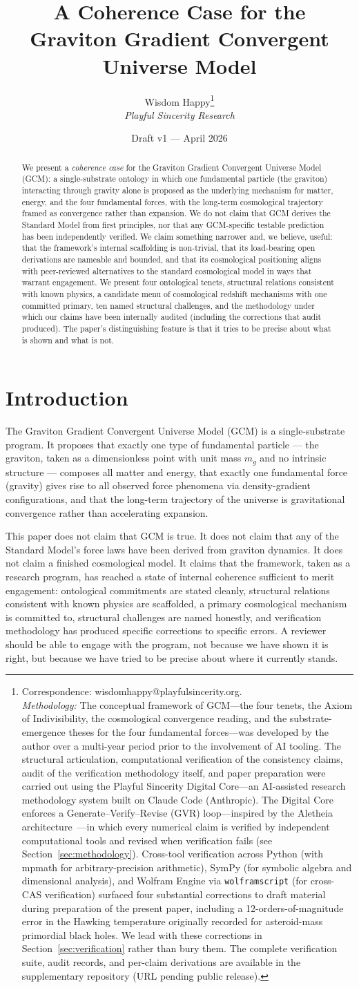 \documentclass[12pt]{article}
\title{A Coherence Case for the \\
Graviton Gradient Convergent Universe Model}
\author{Wisdom Happy\thanks{Correspondence: wisdomhappy@playfulsincerity.org. \\[0.5em]
\textit{Methodology:} The conceptual framework of GCM---the four tenets, the Axiom of Indivisibility, the cosmological convergence reading, and the substrate-emergence theses for the four fundamental forces---was developed by the author over a multi-year period prior to the involvement of AI tooling. The structural articulation, computational verification of the consistency claims, audit of the verification methodology itself, and paper preparation were carried out using the Playful Sincerity Digital Core---an AI-assisted research methodology system built on Claude Code (Anthropic). The Digital Core enforces a Generate--Verify--Revise (GVR) loop---inspired by the Aletheia architecture~\cite{feng2026aletheia}---in which every numerical claim is verified by independent computational tools and revised when verification fails (see Section~\ref{sec:methodology}). Cross-tool verification across Python (with mpmath for arbitrary-precision arithmetic), SymPy (for symbolic algebra and dimensional analysis), and Wolfram Engine via \texttt{wolframscript} (for cross-CAS verification) surfaced four substantial corrections to draft material during preparation of the present paper, including a 12-orders-of-magnitude error in the Hawking temperature originally recorded for asteroid-mass primordial black holes. We lead with these corrections in Section~\ref{sec:verification} rather than bury them. The complete verification suite, audit records, and per-claim derivations are available in the supplementary repository (URL pending public release).} \\[0.3em]
\textit{Playful Sincerity Research}}
\date{Draft v1 --- April 2026}
\theoremstyle{definition}
\theoremstyle{remark}
\begin{document}
\maketitle
\begin{abstract}
We present a \emph{coherence case} for the Graviton Gradient Convergent
Universe Model (GCM): a single-substrate ontology in which one
fundamental particle (the graviton) interacting through gravity alone is
proposed as the underlying mechanism for matter, energy, and the four
fundamental forces, with the long-term cosmological trajectory framed as
convergence rather than expansion. We do not claim that GCM derives the
Standard Model from first principles, nor that any GCM-specific testable
prediction has been independently verified. We claim something narrower
and, we believe, useful: that the framework's internal scaffolding is
non-trivial, that its load-bearing open derivations are nameable and
bounded, and that its cosmological positioning aligns with peer-reviewed
alternatives to the standard cosmological model in ways that warrant
engagement. We present four ontological tenets,
structural relations consistent with known physics, a candidate menu of
cosmological redshift mechanisms with one committed primary, ten named
structural challenges, and the methodology under which our claims have
been internally audited (including the corrections that audit produced).
The paper's distinguishing feature is that it tries to be precise about
what is shown and what is not.
\end{abstract}

\section{Introduction}\label{sec:intro}

The Graviton Gradient Convergent Universe Model (GCM) is a
single-substrate program. It proposes that exactly one type of
fundamental particle --- the graviton, taken as a dimensionless point
with unit mass \(m_g\) and no intrinsic structure --- composes all
matter and energy, that exactly one fundamental force (gravity) gives
rise to all observed force phenomena via density-gradient
configurations, and that the long-term trajectory of the universe is
gravitational convergence rather than accelerating expansion.

This paper does not claim that GCM is true. It does not claim that any
of the Standard Model's force laws have been derived from graviton
dynamics. It does not claim a finished cosmological model. It claims
that the framework, taken as a research program, has reached a state of
internal coherence sufficient to merit engagement: ontological
commitments are stated cleanly, structural relations consistent with
known physics are scaffolded, a primary cosmological mechanism is
committed to, structural challenges are named honestly, and verification
methodology has produced specific corrections to specific errors. A
reviewer should be able to engage with the program, not because we have
shown it is right, but because we have tried to be precise about where
it currently stands.
\end{document}
